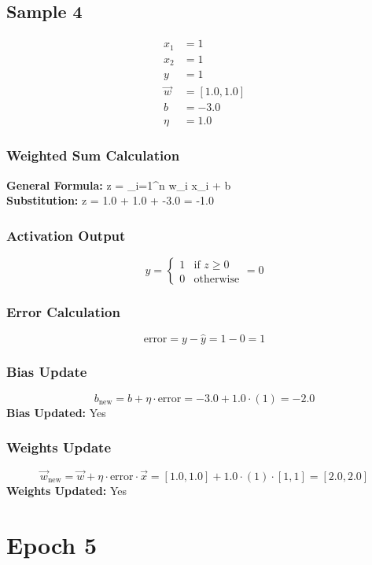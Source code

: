 \documentclass{article}
\begin{document}
\subsection*{Sample 4}
\begin{align*}
x_1 &= 1 \\
x_2 &= 1 \\
y &= 1 \\
\vec{w} &= [1.0, 1.0] \\
b &= -3.0 \\
\eta &= 1.0
\end{align*}

\subsubsection*{Weighted Sum Calculation}
\textbf{General Formula:} \quad
z = \sum_{i=1}^{n} w_i x_i + b
\\
\textbf{Substitution:} \quad
z = 1.0  + 1.0  + -3.0 = -1.0

\subsubsection*{Activation Output}
\[
\hat{y} =
\begin{cases}
1 & \text{if } z \geq 0 \\
0 & \text{otherwise}
\end{cases}
= 0
\]

\subsubsection*{Error Calculation}
\[
\text{error} = y - \hat{y} = 1 - 0 = 1
\]

\subsubsection*{Bias Update}
\[
b_{\text{new}} = b + \eta \cdot \text{error} = -3.0 + 1.0 \cdot (1) = -2.0
\]
\textbf{Bias Updated:} Yes

\subsubsection*{Weights Update}
\[
\vec{w}_{\text{new}} = \vec{w} + \eta \cdot \text{error} \cdot \vec{x} = 
[1.0, 1.0] + 1.0 \cdot (1) \cdot [1, 1] = 
[2.0, 2.0]
\]
\textbf{Weights Updated:} Yes

\section*{Epoch 5}
\end{document}
